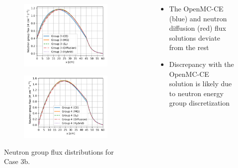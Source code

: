 \begin{frame}
\begin{columns}
\begin{figure}
\begin{subfigure}[t]{.45\textwidth}
      \end{subfigure}
      \begin{subfigure}[t]{.45\textwidth}
        \centering
        \includegraphics[width=\textwidth]{../images/case-3b-group-3-flux}
        \label{fig:c3bg3}
      \end{subfigure}
      \begin{subfigure}[t]{.45\textwidth}
        \centering
        \includegraphics[width=\textwidth]{../images/case-3b-group-4-flux}
        \label{fig:c3bg4}
      \end{subfigure}
      \caption{Neutron group flux distributions for Case 3b.}
      \label{fig:c3bflux}
    \end{figure}
    \column{4cm}
    \begin{itemize}
      \item The OpenMC-CE (blue) and neutron diffusion (red) flux solutions deviate from the rest
      \item Discrepancy with the OpenMC-CE solution is likely due to neutron energy group
        discretization
    \end{itemize}
  \end{columns}
\end{frame}

